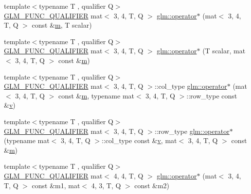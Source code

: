 \begin{DoxyCompactItemize}
\item 
{\footnotesize template$<$typename T , qualifier Q$>$ }\\\mbox{\hyperlink{setup_8hpp_a33fdea6f91c5f834105f7415e2a64407}{G\+L\+M\+\_\+\+F\+U\+N\+C\+\_\+\+Q\+U\+A\+L\+I\+F\+I\+ER}} mat$<$ 3, 4, T, Q $>$ \mbox{\hyperlink{namespaceglm_a09af414dfec8e5eff15027c861c97c60}{glm\+::operator$\ast$}} (mat$<$ 3, 4, T, Q $>$ const \&\mbox{\hyperlink{_s_d_l__opengl__glext_8h_af593500c283bf1a787a6f947f503a5c2}{m}}, T scalar)
\item 
{\footnotesize template$<$typename T , qualifier Q$>$ }\\\mbox{\hyperlink{setup_8hpp_a33fdea6f91c5f834105f7415e2a64407}{G\+L\+M\+\_\+\+F\+U\+N\+C\+\_\+\+Q\+U\+A\+L\+I\+F\+I\+ER}} mat$<$ 3, 4, T, Q $>$ \mbox{\hyperlink{namespaceglm_ab4a2084b36d4588ff869ed7c747f3c0a}{glm\+::operator$\ast$}} (T scalar, mat$<$ 3, 4, T, Q $>$ const \&\mbox{\hyperlink{_s_d_l__opengl__glext_8h_af593500c283bf1a787a6f947f503a5c2}{m}})
\item 
{\footnotesize template$<$typename T , qualifier Q$>$ }\\\mbox{\hyperlink{setup_8hpp_a33fdea6f91c5f834105f7415e2a64407}{G\+L\+M\+\_\+\+F\+U\+N\+C\+\_\+\+Q\+U\+A\+L\+I\+F\+I\+ER}} mat$<$ 3, 4, T, Q $>$\+::col\+\_\+type \mbox{\hyperlink{namespaceglm_abd71409fec017293b28bad82e4352e4a}{glm\+::operator$\ast$}} (mat$<$ 3, 4, T, Q $>$ const \&\mbox{\hyperlink{_s_d_l__opengl__glext_8h_af593500c283bf1a787a6f947f503a5c2}{m}}, typename mat$<$ 3, 4, T, Q $>$\+::row\+\_\+type const \&\mbox{\hyperlink{_s_d_l__opengl_8h_a10a82eabcb59d2fcd74acee063775f90}{v}})
\item 
{\footnotesize template$<$typename T , qualifier Q$>$ }\\\mbox{\hyperlink{setup_8hpp_a33fdea6f91c5f834105f7415e2a64407}{G\+L\+M\+\_\+\+F\+U\+N\+C\+\_\+\+Q\+U\+A\+L\+I\+F\+I\+ER}} mat$<$ 3, 4, T, Q $>$\+::row\+\_\+type \mbox{\hyperlink{namespaceglm_a34ecb8c2c0525e10d9d1c0bbf8e2e1f3}{glm\+::operator$\ast$}} (typename mat$<$ 3, 4, T, Q $>$\+::col\+\_\+type const \&\mbox{\hyperlink{_s_d_l__opengl_8h_a10a82eabcb59d2fcd74acee063775f90}{v}}, mat$<$ 3, 4, T, Q $>$ const \&\mbox{\hyperlink{_s_d_l__opengl__glext_8h_af593500c283bf1a787a6f947f503a5c2}{m}})
\item 
{\footnotesize template$<$typename T , qualifier Q$>$ }\\\mbox{\hyperlink{setup_8hpp_a33fdea6f91c5f834105f7415e2a64407}{G\+L\+M\+\_\+\+F\+U\+N\+C\+\_\+\+Q\+U\+A\+L\+I\+F\+I\+ER}} mat$<$ 4, 4, T, Q $>$ \mbox{\hyperlink{namespaceglm_a8cf5a419af6088f7e2ef9f05509e0acb}{glm\+::operator$\ast$}} (mat$<$ 3, 4, T, Q $>$ const \&m1, mat$<$ 4, 3, T, Q $>$ const \&m2)

\end{DoxyCompactItemize}
